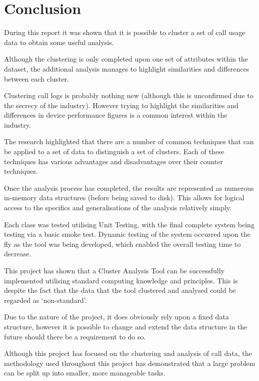 \chapter{Conclusion}
\label{cha:conclusion}

During this report it was shown that it is possible to cluster a set of call 
usage data to obtain some useful analysis. 

Although the clustering is only completed upon one set of attributes within the
dataset, the additional analysis manages to highlight similarities and 
differences between each cluster.

Clustering call logs is probably nothing new (although this is unconfirmed due
to the secrecy of the industry). However trying to highlight the similarities 
and differences in device performance figures is a common interest within the
industry.

The research highlighted that there are a number of common techniques that can 
be applied to a set of data to distinguish a set of clusters. Each of these 
techniques has various advantages and disadvantages over their counter 
techniques.

Once the analysis process has completed, the results are represented as 
numerous in-memory data structures (before being saved to disk). This allows 
for logical access to the specifics and generalisations of the analysis 
relatively simply.

Each class was tested utilising Unit Testing, with the final complete system 
being testing via a basic smoke test. Dynamic testing of the system occurred 
upon the fly as the tool was being developed, which enabled the overall testing
time to decrease.

This project has shown that a Cluster Analysis Tool can be successfully 
implemented utilising standard computing knowledge and principles. This is 
despite the fact that the data that the tool clustered and analysed could be 
regarded as `non-standard'.

Due to the nature of the project, it does obviously rely upon a fixed data 
structure, however it is possible to change and extend the data structure in 
the future should there be a requirement to do so.

Although this project has focused on the clustering and analysis of call data, 
the methodology used throughout this project has demonstrated that a large 
problem can be split up into smaller, more manageable tasks.
